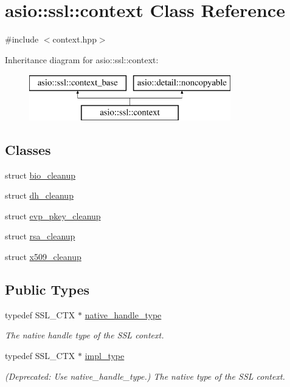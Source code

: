 \hypertarget{classasio_1_1ssl_1_1context}{}\section{asio\+:\+:ssl\+:\+:context Class Reference}
\label{classasio_1_1ssl_1_1context}


{\ttfamily \#include $<$context.\+hpp$>$}

Inheritance diagram for asio\+:\+:ssl\+:\+:context\+:\begin{figure}[H]
\begin{center}
\leavevmode
\includegraphics[height=2.000000cm]{classasio_1_1ssl_1_1context}
\end{center}
\end{figure}
\subsection*{Classes}
\begin{DoxyCompactItemize}
\item 
struct \hyperlink{structasio_1_1ssl_1_1context_1_1bio__cleanup}{bio\+\_\+cleanup}
\item 
struct \hyperlink{structasio_1_1ssl_1_1context_1_1dh__cleanup}{dh\+\_\+cleanup}
\item 
struct \hyperlink{structasio_1_1ssl_1_1context_1_1evp__pkey__cleanup}{evp\+\_\+pkey\+\_\+cleanup}
\item 
struct \hyperlink{structasio_1_1ssl_1_1context_1_1rsa__cleanup}{rsa\+\_\+cleanup}
\item 
struct \hyperlink{structasio_1_1ssl_1_1context_1_1x509__cleanup}{x509\+\_\+cleanup}
\end{DoxyCompactItemize}
\subsection*{Public Types}
\begin{DoxyCompactItemize}
\item 
typedef S\+S\+L\+\_\+\+C\+T\+X $\ast$ \hyperlink{classasio_1_1ssl_1_1context_a9f209f7e8420cbc694612e47eff53cc1}{native\+\_\+handle\+\_\+type}
\begin{DoxyCompactList}\small\item\em The native handle type of the S\+S\+L context. \end{DoxyCompactList}\item 
typedef S\+S\+L\+\_\+\+C\+T\+X $\ast$ \hyperlink{classasio_1_1ssl_1_1context_a5d497f2bb2fc277da12dc07c6ceea6fd}{impl\+\_\+type}
\begin{DoxyCompactList}\small\item\em (Deprecated\+: Use native\+\_\+handle\+\_\+type.) The native type of the S\+S\+L context. \end{DoxyCompactList}\end{DoxyCompactItemize}
